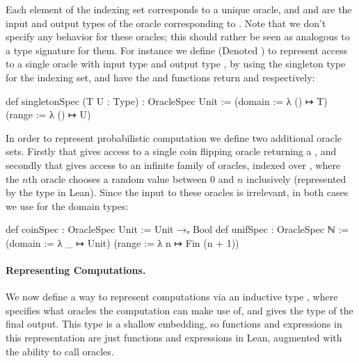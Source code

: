 Each element  of the indexing set corresponds to a unique oracle, and  and  are the input and output types of the oracle corresponding to .
Note that we don't specify any behavior for these oracles; this should rather be seen as analogous to a type signature for them.
For instance we define  (Denoted ) to represent access to
a single oracle with input type  and output type ,
by using the singleton type  for the indexing set, and have the  and  functions return  and  respectively:
\begin{leancode}
  def singletonSpec (T U : Type) : OracleSpec Unit :=
    (domain := λ () ↦ T) (range := λ () ↦ U)
\end{leancode}

In order to represent probabilistic computation we define two additional oracle sets.
Firstly  that gives access to a single coin flipping oracle returning a ,
and secondly  that gives access to an infinite family of oracles, indexed over , where the $n$th oracle chooses a random value between $0$ and $n$ inclusively (represented by the type  in Lean).
Since the input to these oracles is irrelevant, in both cases we use  for the domain types:
\begin{leancode}
  def coinSpec : OracleSpec Unit := Unit →ₒ Bool
  def unifSpec : OracleSpec ℕ :=
    (domain := λ _ ↦ Unit) (range := λ n ↦ Fin (n + 1))
\end{leancode}

\paragraph{Representing Computations.}
We now define a way to represent computations via an inductive type , where  specifies what oracles the computation can make use of, and  gives the type of the final output.
This type is a shallow embedding, so functions and expressions in this representation are just functions and expressions in Lean, augmented with the ability to call oracles.

